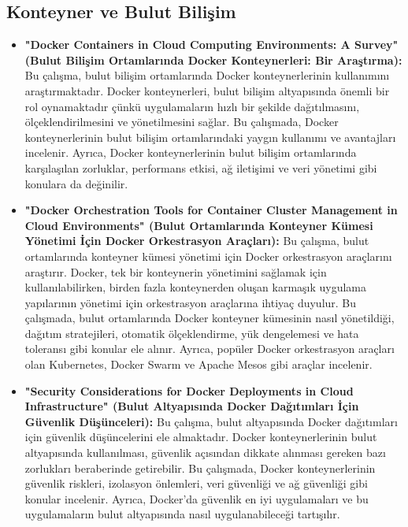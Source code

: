 \subsection{Konteyner ve Bulut Bilişim}
\begin{itemize}
 \item \textbf{"Docker Containers in Cloud Computing Environments: A Survey" (Bulut Bilişim Ortamlarında Docker Konteynerleri: Bir Araştırma):}
 Bu çalışma, bulut bilişim ortamlarında Docker konteynerlerinin kullanımını araştırmaktadır. Docker konteynerleri, bulut bilişim altyapısında önemli bir rol oynamaktadır çünkü uygulamaların hızlı bir şekilde dağıtılmasını, ölçeklendirilmesini ve yönetilmesini sağlar. Bu çalışmada, Docker konteynerlerinin bulut bilişim ortamlarındaki yaygın kullanımı ve avantajları incelenir. Ayrıca, Docker konteynerlerinin bulut bilişim ortamlarında karşılaşılan zorluklar, performans etkisi, ağ iletişimi ve veri yönetimi gibi konulara da değinilir.\\
 \item \textbf{"Docker Orchestration Tools for Container Cluster Management in Cloud Environments" (Bulut Ortamlarında Konteyner Kümesi Yönetimi İçin Docker Orkestrasyon Araçları):}
 Bu çalışma, bulut ortamlarında konteyner kümesi yönetimi için Docker orkestrasyon araçlarını araştırır. Docker, tek bir konteynerin yönetimini sağlamak için kullanılabilirken, birden fazla konteynerden oluşan karmaşık uygulama yapılarının yönetimi için orkestrasyon araçlarına ihtiyaç duyulur. Bu çalışmada, bulut ortamlarında Docker konteyner kümesinin nasıl yönetildiği, dağıtım stratejileri, otomatik ölçeklendirme, yük dengelemesi ve hata toleransı gibi konular ele alınır. Ayrıca, popüler Docker orkestrasyon araçları olan Kubernetes, Docker Swarm ve Apache Mesos gibi araçlar incelenir.\\
\item \textbf {"Security Considerations for Docker Deployments in Cloud Infrastructure" (Bulut Altyapısında Docker Dağıtımları İçin Güvenlik Düşünceleri):}
 Bu çalışma, bulut altyapısında Docker dağıtımları için güvenlik düşüncelerini ele almaktadır. Docker konteynerlerinin bulut altyapısında kullanılması, güvenlik açısından dikkate alınması gereken bazı zorlukları beraberinde getirebilir. Bu çalışmada, Docker konteynerlerinin güvenlik riskleri, izolasyon önlemleri, veri güvenliği ve ağ güvenliği gibi konular incelenir. Ayrıca, Docker'da güvenlik en iyi uygulamaları ve bu uygulamaların bulut altyapısında nasıl uygulanabileceği tartışılır.
\end{itemize}
